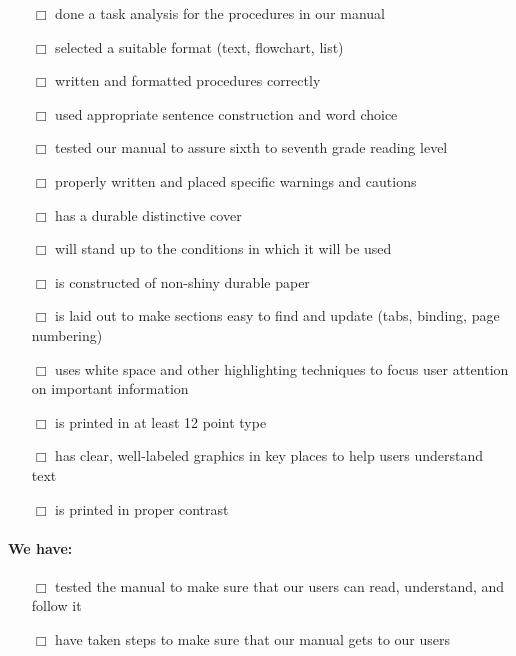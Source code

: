 \documentclass[12pt, letterpaper, oneside]{article}
\begin{document}
\begin{multicols}{2}
\begin{itemize} \itemsep -2pt
	\item[$\Box$]  done a task analysis for the procedures in our manual
	\item[$\Box$]  selected a suitable format (text, flowchart, list)
	\item[$\Box$]  written and formatted procedures correctly
	\item[$\Box$]  used appropriate sentence construction and word choice
	\item[$\Box$]  tested our manual to assure sixth to seventh grade reading level
	\item[$\Box$]  properly written and placed specific warnings and cautions
	\item[$\Box$]  has a durable distinctive cover
	\item[$\Box$]  will stand up to the conditions in which it will be used
	\item[$\Box$]  is constructed of non-shiny durable paper
	\item[$\Box$]  is laid out to make sections easy to find and update (tabs, binding, page numbering)
	\item[$\Box$]  uses white space and other highlighting techniques to focus user attention on important information
	\item[$\Box$]  is printed in at least 12 point type
	\item[$\Box$]  has clear, well-labeled graphics in key places to help users understand text
	\item[$\Box$]  is printed in proper contrast
\end{itemize}

\paragraph{We have:}

\begin{itemize} \itemsep -2pt
	\item[$\Box$]  tested the manual to make sure that our users can read, understand, and follow it
	\item[$\Box$]  have taken steps to make sure that our manual gets to our users 
\end{itemize}

\end{multicols}
\end{document}

